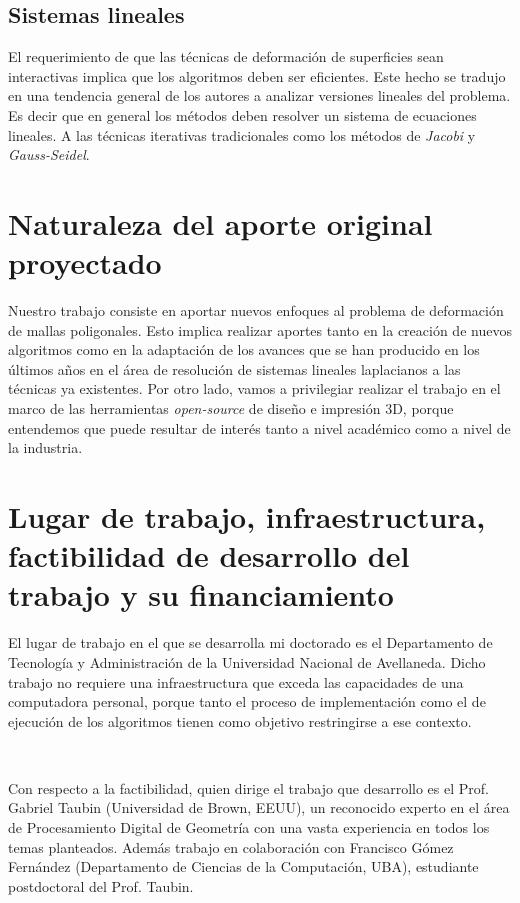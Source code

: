 \documentclass{article}
\begin{document}
\subsection{Sistemas lineales}
El requerimiento de que las técnicas de deformación de superficies sean 
interactivas implica que los algoritmos deben ser eficientes. Este hecho 
se tradujo en una tendencia general de los autores a analizar versiones lineales 
del problema. Es decir que en general los métodos deben resolver un sistema 
de ecuaciones lineales. A las técnicas iterativas tradicionales como los 
métodos de \emph{Jacobi} y \emph{Gauss-Seidel}.

\section{Naturaleza del aporte original proyectado}

Nuestro trabajo consiste en aportar nuevos enfoques al problema de 
deformación de mallas poligonales. Esto implica realizar aportes tanto en 
la creación de nuevos algoritmos como en la adaptación de los avances 
que se han producido en los últimos años en el área de resolución de 
sistemas lineales laplacianos a las técnicas ya existentes. Por otro lado, 
vamos a privilegiar realizar el trabajo en el marco de las herramientas 
\emph{open-source} de diseño e impresión 3D, porque entendemos que puede 
resultar de interés tanto a nivel académico como a nivel de la industria. 

\section{Lugar de trabajo, infraestructura, factibilidad de desarrollo del trabajo y su financiamiento}

El lugar de trabajo en el que se desarrolla mi doctorado es el Departamento 
de Tecnología y Administración de la Universidad Nacional de Avellaneda. 
Dicho trabajo no requiere una infraestructura que exceda las capacidades 
de una computadora personal, porque tanto el proceso de implementación como 
el de ejecución de los algoritmos tienen como objetivo restringirse a ese 
contexto.

\

Con respecto a la factibilidad, quien dirige el trabajo que desarrollo es 
el Prof. Gabriel Taubin (Universidad de Brown, EEUU), un reconocido experto 
en el área de Procesamiento Digital de Geometría con una vasta experiencia 
en todos los temas planteados. Además trabajo en colaboración 
con Francisco Gómez Fernández (Departamento de Ciencias de la Computación, 
UBA), estudiante postdoctoral del Prof. Taubin.
\end{document}
